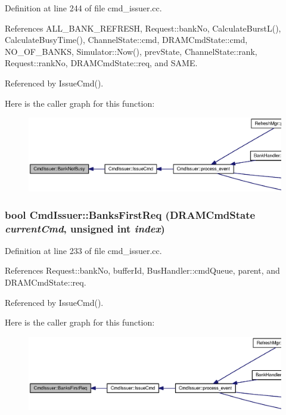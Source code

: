 Definition at line 244 of file cmd\_\-issuer.cc.

References ALL\_\-BANK\_\-REFRESH, Request::bankNo, CalculateBurstL(), CalculateBusyTime(), ChannelState::cmd, DRAMCmdState::cmd, NO\_\-OF\_\-BANKS, Simulator::Now(), prevState, ChannelState::rank, Request::rankNo, DRAMCmdState::req, and SAME.

Referenced by IssueCmd().

Here is the caller graph for this function:\nopagebreak
\begin{figure}[H]
\begin{center}
\leavevmode
\includegraphics[width=420pt]{classCmdIssuer_5e446a025168cc448e4ad4ed70868b02_icgraph}
\end{center}
\end{figure}
\subsubsection[{BanksFirstReq}]{\setlength{\rightskip}{0pt plus 5cm}bool CmdIssuer::BanksFirstReq ({\bf DRAMCmdState} {\em currentCmd}, \/  unsigned int {\em index})}\label{classCmdIssuer_9be81ccce536ec245fc32d5a1d661e15}




Definition at line 233 of file cmd\_\-issuer.cc.

References Request::bankNo, bufferId, BusHandler::cmdQueue, parent, and DRAMCmdState::req.

Referenced by IssueCmd().

Here is the caller graph for this function:\nopagebreak
\begin{figure}[H]
\begin{center}
\leavevmode
\includegraphics[width=420pt]{classCmdIssuer_9be81ccce536ec245fc32d5a1d661e15_icgraph}
\end{center}
\end{figure}
